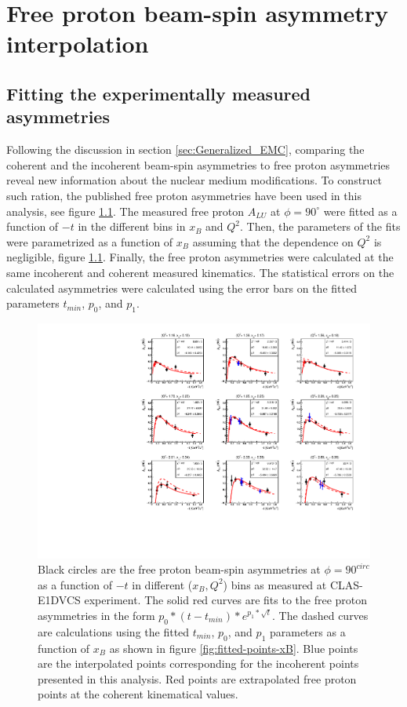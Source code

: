 \chapter{Free proton beam-spin asymmetry interpolation} 
\label{app:free-proton-alu}
\section{Fitting the experimentally measured asymmetries}
Following the discussion in section \ref{sec:Generalized_EMC}, comparing the 
coherent and the incoherent beam-spin asymmetries to free proton asymmetries 
reveal new information about the nuclear medium modifications. To construct 
such ration, the published free proton asymmetries \cite{FX_BSA} have been used 
in this analysis, see figure \ref{fig:free-proton-alu}. The measured free 
proton $A_{LU}$ at $\phi = 90^{\circ}$ were fitted as a function of $-t$ in the 
different bins in $x_B$ and $Q^2$. Then, the parameters of the fits were 
parametrized as a function of $x_B$ assuming that the dependence on $Q^2$ is 
negligible, figure \ref{fig:free-proton-alu}. Finally, the free proton 
asymmetries were calculated at the same incoherent and coherent measured 
kinematics. The statistical errors on the calculated asymmetries were 
calculated using the error bars on the fitted parameters $t_{min}$, $p_0$, and 
$p_1$.\\ 


\begin{figure}[tpb]
\centering
\includegraphics[scale=0.85]{fig_updated/ALU-proton-fits.pdf}
\caption{Black circles are the free proton beam-spin asymmetries at $\phi = 90 
^{circ}$ as a function of $-t$ in different ($x_B, Q^2$) bins as measured at 
CLAS-E1DVCS experiment. The solid red curves are fits to the free proton 
asymmetries in the form $p_{0}*(t-t_{min})*e^{p_{1}*\sqrt{t}}$. The dashed 
curves are calculations using the fitted $t_{min}$, $p_0$, and $p_1$ parameters 
as a function of $x_B$ as shown in figure \ref{fig:fitted-points-xB}. Blue 
points are the interpolated points corresponding for the incoherent points 
presented in this analysis. Red points are extrapolated free proton points at 
the coherent kinematical values.}
\label{fig:free-proton-alu}
\end{figure}

